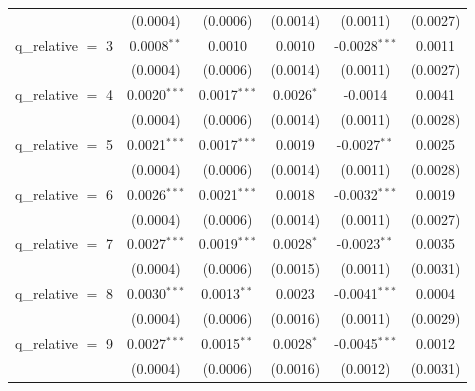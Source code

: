 \begin{tabular}{lccccc}
                        & (0.0004)        & (0.0006)               & (0.0014)          & (0.0011)                      & (0.0027)\\   
   q\_relative $=$ 3    & 0.0008$^{**}$   & 0.0010                 & 0.0010            & -0.0028$^{***}$               & 0.0011\\   
                        & (0.0004)        & (0.0006)               & (0.0014)          & (0.0011)                      & (0.0027)\\   
   q\_relative $=$ 4    & 0.0020$^{***}$  & 0.0017$^{***}$         & 0.0026$^{*}$      & -0.0014                       & 0.0041\\   
                        & (0.0004)        & (0.0006)               & (0.0014)          & (0.0011)                      & (0.0028)\\   
   q\_relative $=$ 5    & 0.0021$^{***}$  & 0.0017$^{***}$         & 0.0019            & -0.0027$^{**}$                & 0.0025\\   
                        & (0.0004)        & (0.0006)               & (0.0014)          & (0.0011)                      & (0.0028)\\   
   q\_relative $=$ 6    & 0.0026$^{***}$  & 0.0021$^{***}$         & 0.0018            & -0.0032$^{***}$               & 0.0019\\   
                        & (0.0004)        & (0.0006)               & (0.0014)          & (0.0011)                      & (0.0027)\\   
   q\_relative $=$ 7    & 0.0027$^{***}$  & 0.0019$^{***}$         & 0.0028$^{*}$      & -0.0023$^{**}$                & 0.0035\\   
                        & (0.0004)        & (0.0006)               & (0.0015)          & (0.0011)                      & (0.0031)\\   
   q\_relative $=$ 8    & 0.0030$^{***}$  & 0.0013$^{**}$          & 0.0023            & -0.0041$^{***}$               & 0.0004\\   
                        & (0.0004)        & (0.0006)               & (0.0016)          & (0.0011)                      & (0.0029)\\   
   q\_relative $=$ 9    & 0.0027$^{***}$  & 0.0015$^{**}$          & 0.0028$^{*}$      & -0.0045$^{***}$               & 0.0012\\   
                        & (0.0004)        & (0.0006)               & (0.0016)          & (0.0012)                      & (0.0031)\\   

\end{tabular}
